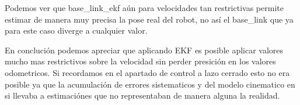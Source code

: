 Podemos ver que base\_link\_ekf aún para velocidades tan restrictivas permite estimar de manera muy precisa la pose real del robot, no así el base\_link que ya para este caso diverge a cualquier valor.

En conclución podemos apreciar que aplicando EKF es posible aplicar valores mucho mas restrictivos sobre la velocidad sin perder presición en los valores odometricos. Si recordamos en el apartado de control a lazo cerrado esto no era posible ya que la acumulación de errores sistematicos y del modelo cinematico en si llevaba a estimaciónes que no representaban de manera alguna la realidad. 

